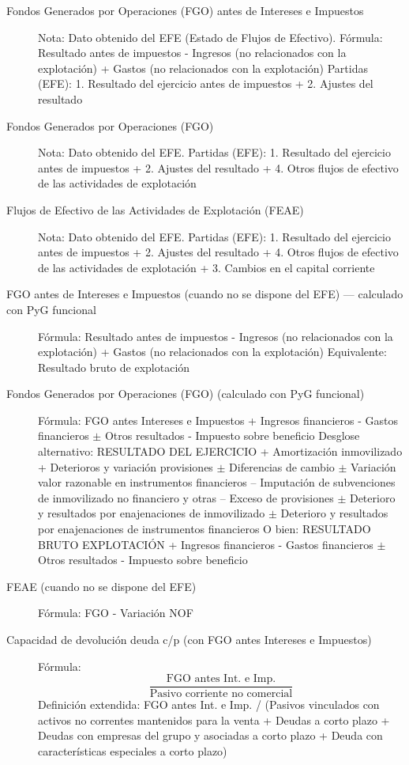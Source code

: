 \documentclass[12pt]{book} %
\begin{document}
\begin{description}
\item[Fondos Generados por Operaciones (FGO) antes de Intereses e Impuestos]
Nota: Dato obtenido del EFE (Estado de Flujos de Efectivo).
Fórmula: Resultado antes de impuestos - Ingresos (no relacionados con la explotación) + Gastos (no relacionados con la explotación)
Partidas (EFE): 1. Resultado del ejercicio antes de impuestos + 2. Ajustes del resultado

\item[Fondos Generados por Operaciones (FGO)]
Nota: Dato obtenido del EFE.
Partidas (EFE): 1. Resultado del ejercicio antes de impuestos + 2. Ajustes del resultado + 4. Otros flujos de efectivo de las actividades de explotación

\item[Flujos de Efectivo de las Actividades de Explotación (FEAE)]
Nota: Dato obtenido del EFE.
Partidas (EFE): 1. Resultado del ejercicio antes de impuestos + 2. Ajustes del resultado + 4. Otros flujos de efectivo de las actividades de explotación + 3. Cambios en el capital corriente

\item[FGO antes de Intereses e Impuestos (cuando no se dispone del EFE) — calculado con PyG funcional]
Fórmula: Resultado antes de impuestos - Ingresos (no relacionados con la explotación) + Gastos (no relacionados con la explotación)
Equivalente: Resultado bruto de explotación

\item[Fondos Generados por Operaciones (FGO) (calculado con PyG funcional)]
Fórmula: FGO antes Intereses e Impuestos + Ingresos financieros - Gastos financieros $\pm$ Otros resultados - Impuesto sobre beneficio
Desglose alternativo: RESULTADO DEL EJERCICIO + Amortización inmovilizado + Deterioros y variación provisiones $\pm$ Diferencias de cambio $\pm$ Variación valor razonable en instrumentos financieros – Imputación de subvenciones de inmovilizado no financiero y otras – Exceso de provisiones $\pm$ Deterioro y resultados por enajenaciones de inmovilizado $\pm$ Deterioro y resultados por enajenaciones de instrumentos financieros
O bien: RESULTADO BRUTO EXPLOTACIÓN + Ingresos financieros - Gastos financieros $\pm$ Otros resultados - Impuesto sobre beneficio

\item[FEAE (cuando no se dispone del EFE)]
Fórmula: FGO - Variación NOF

\item[Capacidad de devolución deuda c/p (con FGO antes Intereses e Impuestos)]
Fórmula: $$\displaystyle \frac{\text{FGO antes Int. e Imp.}}{\text{Pasivo corriente no comercial}}$$
Definición extendida: FGO antes Int. e Imp. / (Pasivos vinculados con activos no correntes mantenidos para la venta + Deudas a corto plazo + Deudas con empresas del grupo y asociadas a corto plazo + Deuda con características especiales a corto plazo)


\end{description}
\end{document}
